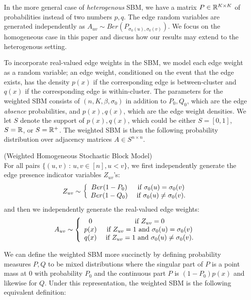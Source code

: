 \documentclass{article}
\begin{document}
In the more general case of \emph{heterogenous} SBM, we have a matrix $P \in {\mathbb R}^{K \times K}$ of probabilities instead of two numbers $p,q$. The edge random variables are generated independently as $A_{uv} \sim Ber(P_{\sigma_0(u), \sigma_0(v)})$. We focus on the homogeneous case in this paper and discuss how our results may extend to the heterogenous setting.

To incorporate real-valued edge weights in the SBM, we model each edge weight as a random variable; an edge weight, conditioned on the event that the edge exists, has the density $p(x)$ if the corresponding edge is between-cluster and $q(x)$ if the corresponding edge is within-cluster. The parameters for the weighted SBM consists of $(n, K, \beta, \sigma_0)$ in addition to $P_0, Q_0$, which are the edge \emph{absence} probabilities, and $p(x), q(x)$, which are the edge weight densities. We let $S$ denote the support of $p(x), q(x)$, which could be either $S=[0,1]$, $S = {\mathbb R}$, or $S = {\mathbb R}^+$. The weighted SBM is then the following probability distribution over adjacency matrices $A \in S^{n \times n}$.

\begin{definition}
\label{def:weighted_homo_sbm1}
(Weighted Homogeneous Stochastic Block Model) \\
For all pairs $\{ (u, v) \,:\, u,v \in [n], u < v \}$, 
 we first independently generate the edge presence indicator variables $Z_{uv}$'s:
\[
Z_{uv} \sim 
    \left\{ \begin{array}{cc}
    Ber(1-P_0) & \textrm{ if } \sigma_0(u) = \sigma_0(v) \\
    Ber(1-Q_0) & \textrm{ if } \sigma_0(u) \neq \sigma_0(v).
   \end{array} \right.
\]
and then we independently generate the real-valued edge weights:
\[
A_{uv} \sim \left\{ \begin{array}{cc} 
     0 & \textrm{ if } Z_{uv} = 0 \\
     p(x) & \textrm{ if } Z_{uv} = 1 \textrm{ and } \sigma_0(u) = \sigma_0(v) \\
     q(x) & \textrm{ if } Z_{uv} = 1 \textrm{ and } \sigma_0(u) \neq \sigma_0(v). 
\end{array} \right.
\]
\end{definition}

We can define the weighted SBM more succinctly by defining probability measures $P, Q$ to be mixed distributions where the singular part of $P$ is a point mass at $0$ with probability $P_0$ and the continuous part $P$ is $(1-P_0) p(x)$ and likewise for $Q$. Under this representation, the weighted SBM is the following equivalent definition:
\end{document}
